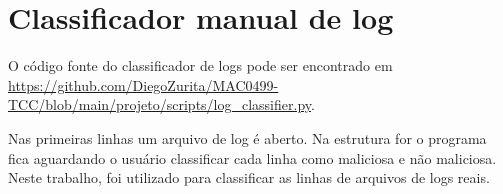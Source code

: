 
\chapter{Classificador manual de log}
\label{ap:log_classifier}

O código fonte do classificador de logs pode ser encontrado em \url{https://github.com/DiegoZurita/MAC0499-TCC/blob/main/projeto/scripts/log_classifier.py}.

Nas primeiras linhas um arquivo de log é aberto. Na estrutura for o programa fica aguardando o usuário classificar cada linha
como maliciosa e não maliciosa. Neste trabalho, foi utilizado para classificar as linhas de arquivos de logs reais.
